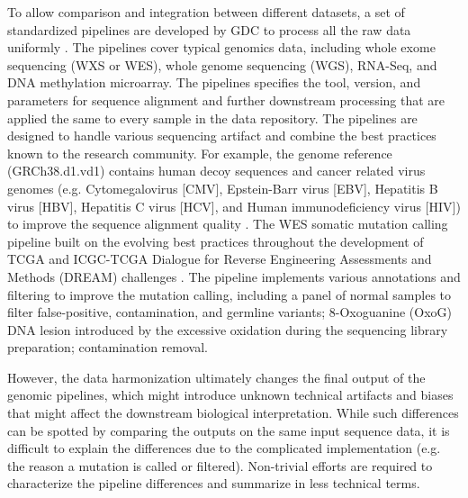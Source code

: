 
To allow comparison and integration between different datasets, a set of standardized pipelines are developed by GDC to process all the raw data uniformly \cite{zhangz_grossmanrl:UniformGenomic2021}. The pipelines cover typical genomics data, including whole exome sequencing (WXS or WES), whole genome sequencing (WGS), RNA-Seq, and DNA methylation microarray. The pipelines specifies the tool, version, and parameters for sequence alignment and further downstream processing that are applied the same to every sample in the data repository. The pipelines are designed to handle various sequencing artifact and combine the best practices known to the research community. For example, the genome reference (GRCh38.d1.vd1) contains human decoy sequences and cancer related virus genomes (e.g. Cytomegalovirus [CMV], Epstein-Barr virus [EBV], Hepatitis B virus [HBV], Hepatitis C virus [HCV], and Human immunodeficiency virus [HIV]) to improve the sequence alignment quality \cite{zhangz_grossmanrl:UniformGenomic2021}. The WES somatic mutation calling pipeline built on the evolving best practices throughout the development of TCGA and ICGC-TCGA Dialogue for Reverse Engineering Assessments and Methods (DREAM) challenges \cite{ewingad_boutrospc:CombiningTumor2015,ellrottk_tcga:MC3MutationCalling2018}. The pipeline implements various annotations and filtering to improve the mutation calling, including a panel of normal samples to filter false-positive, contamination, and germline variants; 8-Oxoguanine (OxoG) DNA lesion introduced by the excessive oxidation during the sequencing library preparation; contamination removal.

However, the data harmonization ultimately changes the final output of the genomic pipelines, which might introduce unknown technical artifacts and biases that might affect the downstream biological interpretation. While such differences can be spotted by comparing the outputs on the same input sequence data, it is difficult to explain the differences due to the complicated implementation (e.g. the reason a mutation is called or filtered). Non-trivial efforts are required to characterize the pipeline differences and summarize in less technical terms.



